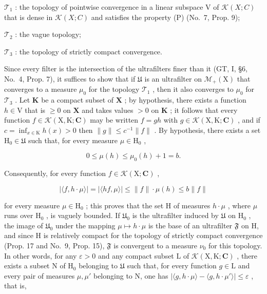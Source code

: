 \(\mathcal{T}_{1}\) : the topology of pointwise convergence in a linear subspace V of \(\mathcal{K}(X;C)\) that is dense in \(\mathcal{K}(X;C)\) and satisfies the property (P) (No.~7, Prop. 9);

\(\mathcal{T}_2\) : the vague topology;

\(\mathcal{T}_3\) : the topology of strictly compact convergence.

Since every filter is the intersection of the ultrafilters finer than it (GT, I, §6, No.~4, Prop. 7), it suffices to show that if \(\mathfrak{U}\) is an ultrafilter on \(\mathcal{M}_{+}(\mathrm{X})\) that converges to a measure \(\mu_0\) for the topology \(\mathcal{T}_1\) , then it also converges to \(\mu_0\) for \(\mathcal{T}_3\) . Let \(\mathbf{K}\) be a compact subset of \(\mathbf{X}\) ; by hypothesis, there exists a function \(h \in \mathrm{V}\) that is \(\geqslant 0\) on \(\mathbf{X}\) and takes values \(>0\) on \(\mathbf{K}\) ; it follows that every function \(f \in \mathcal{K}(\mathrm{X},\mathrm{K};\mathbf{C})\) may be written \(f = gh\) with \(g \in \mathcal{K}(\mathrm{X},\mathrm{K};\mathbf{C})\) , and if \(c = \inf_{x \in \mathrm{K}} h(x) > 0\) then \(\| g \| \leqslant c^{-1} \| f \|\) . By hypothesis, there exists a set \(\mathrm{H}_0 \in \mathfrak{U}\) such that, for every measure \(\mu \in \mathrm{H}_0\) ,

\[
0 \leqslant \mu (h) \leqslant \mu_ {0} (h) + 1 = b.
\]

Consequently, for every function \(f \in \mathcal{K}(\mathrm{X};\mathbf{C})\) ,

\[
| \langle f, h \cdot \mu \rangle | = | \langle h f, \mu \rangle | \leqslant \| f \| \cdot \mu (h) \leqslant b \| f \|
\]

for every measure \(\mu\in\mathrm{H}_{0}\) ; this proves that the set H of measures \(h\cdot\mu\) , where \(\mu\) runs over \(\mathrm{H}_{0}\) , is vaguely bounded. If \(\mathfrak{U}_{0}\) is the ultrafilter induced by \(\mathfrak{U}\) on \(\mathrm{H}_{0}\) , the image of \(\mathfrak{U}_{0}\) under the mapping \(\mu\mapsto h\cdot\mu\) is the base of an ultrafilter \(\mathfrak{F}\) on H, and since H is relatively compact for the topology of strictly compact convergence (Prop. 17 and No.~9, Prop. 15), \(\mathfrak{F}\) is convergent to a measure \(\nu_{0}\) for this topology. In other words, for any \(\varepsilon>0\) and any compact subset L of \(\mathcal{K}(\mathrm{X},\mathrm{K};\mathbf{C})\) , there exists a subset N of \(\mathrm{H}_{0}\) belonging to \(\mathfrak{U}\) such that, for every function \(g\in\mathrm{L}\) and every pair of measures \(\mu,\mu'\) belonging to N, one has \(|\langle g,h\cdot\mu\rangle-\langle g,h\cdot\mu'\rangle|\leqslant\varepsilon\) , that is,

